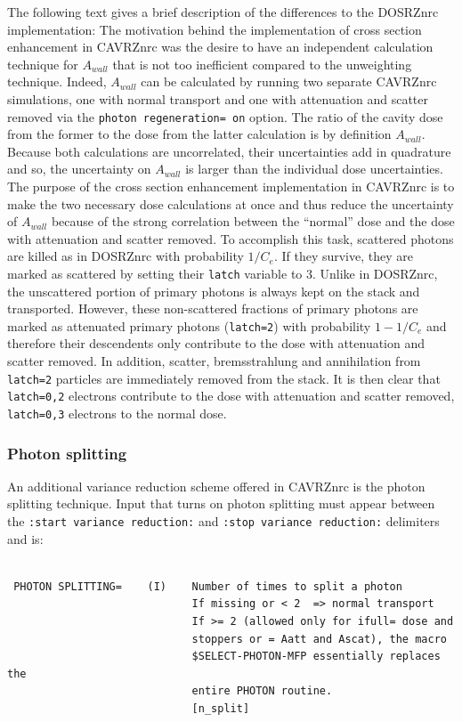 \documentclass[12pt,twoside]{article}  %
\begin{document}
The following text gives a brief description of the differences 
to the DOSRZnrc implementation: The motivation behind the 
implementation of cross section enhancement in CAVRZnrc was the desire to 
have an independent calculation technique for $A_{wall}$ that is 
not too inefficient compared to the unweighting technique. Indeed, 
$A_{wall}$ can be calculated by running two separate CAVRZnrc 
simulations, one with normal transport  and one with attenuation 
and scatter removed via the {\tt photon regeneration= on} option. The ratio of the 
cavity dose from the former to the dose from the latter calculation is by 
definition $A_{wall}$. Because both calculations 
are uncorrelated, their uncertainties add in quadrature and so, the uncertainty 
on $A_{wall}$ is larger than the individual dose uncertainties. 
The purpose of the cross section enhancement implementation in 
CAVRZnrc is to make the two necessary dose calculations at once 
and thus reduce the uncertainty of $A_{wall}$ because of the strong 
correlation between the ``normal'' dose and the dose with 
attenuation and scatter removed. To accomplish this task, 
scattered photons are killed as in DOSRZnrc with probability   
$1/C_e$. If they survive, they are marked as scattered by setting 
their {\tt latch} variable to 3. Unlike in DOSRZnrc, the unscattered 
portion of primary photons is always kept on the stack and transported. 
However, these non-scattered fractions of primary photons are marked 
as attenuated primary photons ({\tt latch=2}) with probability 
$1-1/C_e$ and therefore their descendents only contribute to the 
dose with attenuation and scatter removed. In addition, scatter, 
bremsstrahlung and annihilation from {\tt latch=2} particles are
immediately removed from the stack. It is then clear that 
{\tt latch=0,2} electrons contribute to the dose with 
attenuation and scatter removed, {\tt latch=0,3} electrons to 
the normal dose. 

\subsubsection{Photon splitting}
\label{cavrzsplitsect}

An additional variance reduction scheme offered in CAVRZnrc
is the photon splitting technique.  
Input that turns on photon splitting must appear 
between the {\tt :start variance reduction:}
and {\tt :stop variance reduction:} delimiters and is:
 
\begin{verbatim}

 PHOTON SPLITTING=    (I)    Number of times to split a photon
                             If missing or < 2  => normal transport
                             If >= 2 (allowed only for ifull= dose and
                             stoppers or = Aatt and Ascat), the macro
                             $SELECT-PHOTON-MFP essentially replaces the
                             entire PHOTON routine.
                             [n_split]

\end{verbatim}
\end{document}
